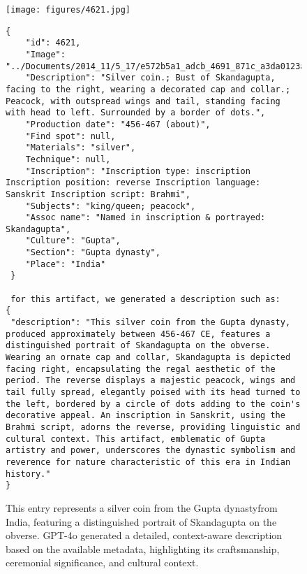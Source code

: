 \documentclass[11pt]{article}
\begin{document}
\begin{figure}[!t]
\begin{tcolorbox}[colback=brown!5, colframe=brown!35,
    fonttitle=\bfseries,
    ]
\small

\lstset{breaklines=true, basicstyle=\scriptsize\ttfamily} 
\begin{center}\texttt{[image: figures/4621.jpg]}\end{center}
\begin{lstlisting}
{
    "id": 4621,
    "Image": "../Documents/2014_11/5_17/e572b5a1_adcb_4691_871c_a3da0123a3fa/preview_01222265_001.jpg",
    "Description": "Silver coin.; Bust of Skandagupta, facing to the right, wearing a decorated cap and collar.; Peacock, with outspread wings and tail, standing facing with head to left. Surrounded by a border of dots.",
    "Production date": "456-467 (about)",
    "Find spot": null,
    "Materials": "silver",
    Technique": null,
    "Inscription": "Inscription type: inscription Inscription position: reverse Inscription language: Sanskrit Inscription script: Brahmi",
    "Subjects": "king/queen; peacock",
    "Assoc name": "Named in inscription & portrayed: Skandagupta",
    "Culture": "Gupta",
    "Section": "Gupta dynasty",
    "Place": "India"
 }
 
 for this artifact, we generated a description such as:
{
 "description": "This silver coin from the Gupta dynasty, produced approximately between 456-467 CE, features a distinguished portrait of Skandagupta on the obverse. Wearing an ornate cap and collar, Skandagupta is depicted facing right, encapsulating the regal aesthetic of the period. The reverse displays a majestic peacock, wings and tail fully spread, elegantly poised with its head turned to the left, bordered by a circle of dots adding to the coin's decorative appeal. An inscription in Sanskrit, using the Brahmi script, adorns the reverse, providing linguistic and cultural context. This artifact, emblematic of Gupta artistry and power, underscores the dynastic symbolism and reverence for nature characteristic of this era in Indian history."
}
\end{lstlisting}
\end{tcolorbox}
\caption{
\small
This entry represents a silver coin from the Gupta dynastyfrom India, featuring a distinguished portrait of Skandagupta on the obverse. GPT-4o generated a detailed, context-aware description based on the available metadata, highlighting its craftsmanship, ceremonial significance, and cultural context.}
\label{fig:raw-data-india}
\end{figure}
\end{document}
